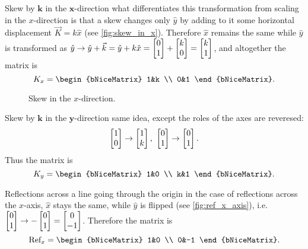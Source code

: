 \begin{descitemize}
	\item[Skew by $\bm{k}$ in the $\bm{x}$-direction] what differentiates this transformation from scaling in the $x$-direction is that a skew changes only $\hat{y}$ by adding to it some horizontal displacement $\vec{K}=k\hat{x}$ (see \autoref{fig:skew_in_x}). Therefore $\hat{x}$ remains the same while $\hat{y}$ is transformed as $\hat{y}\to\hat{y}+\vec{k}=\hat{y}+k\hat{x}=\colvec{0;1}+\colvec{k;0}=\colvec{k;1}$, and altogether the matrix is
		\begin{equation}
			K_{x} = \begin{bNiceMatrix} 1&k \\ 0&1 \end{bNiceMatrix}.
			\label{eq:}
		\end{equation}
		
		\begin{figure}
			\centering
			\caption{Skew in the $x$-direction.}
			\label{fig:skew_in_x}
		\end{figure}

	\item[Skew by $\bm{k}$ in the $\bm{y}$-direction] same idea, except the roles of the axes are reveresed:
		\[
			\colvec{1;0}\to\colvec{1;k},\ \colvec{0;1}\to\colvec{0;1}.
		\]
		Thus the matrix is
		\begin{equation}
			K_{y} = \begin{bNiceMatrix} 1&0 \\ k&1 \end{bNiceMatrix}.
			\label{eq:}
		\end{equation}

	\item[Reflections across a line going through the origin] in the case of reflections across the $x$-axis, $\hat{x}$ stays the same, while $\hat{y}$ is flipped (see \autoref{fig:ref_x_axis}), i.e. $\colvec{0;1}\to-\colvec{0;1}=\colvec{0;-1}$. Therefore the matrix is
		\begin{equation}
			\Refl_{x} = \begin{bNiceMatrix} 1&0 \\ 0&-1 \end{bNiceMatrix}.
		\end{equation}
		

\end{descitemize}
